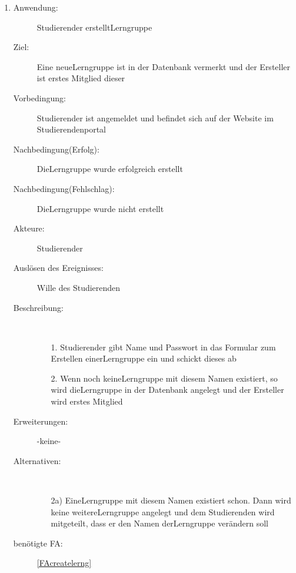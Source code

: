 \documentclass[parskip=full]{scrartcl}
\newcommand{\swtLabel}[1]{\textbf{/#1\arabic*0/}}
\begin{document}
\begin{enumerate}[label=\swtLabel{S}]
  
  \item
  \begin{description}
  \item[Anwendung:] Studierender erstellt\gls{Lerngruppe}
  \item[Ziel:] Eine neue\gls{Lerngruppe} ist in der Datenbank vermerkt und der Ersteller ist erstes Mitglied dieser
  	\item[Vorbedingung:] Studierender ist angemeldet und befindet sich auf der
  	Website im Studierendenportal
  	\item[Nachbedingung(Erfolg):] Die\gls{Lerngruppe} wurde erfolgreich erstellt
  	\item[Nachbedingung(Fehlschlag):] Die\gls{Lerngruppe} wurde nicht erstellt
  	\item[Akteure:] Studierender
  	\item[Auslösen des Ereignisses:] Wille des Studierenden
  	\item[Beschreibung:]~
  	\begin{enumerate}
  	  \item[1.] Studierender gibt Name und Passwort in das Formular zum Erstellen
  	  einer\gls{Lerngruppe} ein und schickt dieses ab %
  	  \item[2.] Wenn noch keine\gls{Lerngruppe} mit diesem Namen existiert, so wird
  	  die\gls{Lerngruppe} in der Datenbank angelegt und der Ersteller wird erstes Mitglied
  	\end{enumerate}
  	\item[Erweiterungen:] -keine-
  	\item[Alternativen:] ~
  	\begin{enumerate}
  	  \item[2a)] Eine\gls{Lerngruppe} mit diesem Namen existiert schon. Dann wird
  	  keine weitere\gls{Lerngruppe} angelegt und dem Studierenden wird mitgeteilt,
  	  dass er den Namen der\gls{Lerngruppe} verändern soll
  	 \end{enumerate}
  	 \item[benötigte FA:] \ref{FAcreatelerng}
  \end{description}
   

\end{enumerate}
\end{document}
